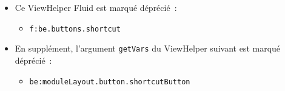 \begin{frame}[fragile]
\begin{itemize}
		\item Ce ViewHelper Fluid est marqué déprécié~:

			\begin{itemize}\smaller
				\item \texttt{f:be.buttons.shortcut}
			\end{itemize}\normalsize

		\item En supplément, l'argument \texttt{getVars} du ViewHelper suivant
			est marqué déprécié~:

			\begin{itemize}\smaller
				\item \texttt{be:moduleLayout.button.shortcutButton}
			\end{itemize}\normalsize

	\end{itemize}

\end{frame}

